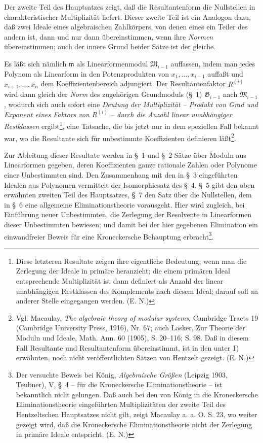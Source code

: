 \documentclass[11pt]{article}
\newcommand{\Gmod}{\mathfrak G}
\newcommand{\mideal}{\mathfrak m}
\begin{document}
Der zweite Teil des Hauptsatzes zeigt, daß die Resultantenform die Nullstellen in charakteristischer Multiplizität liefert. Dieser zweite Teil ist ein Analogon dazu, daß zwei Ideale eines algebraischen Zahlkörpers, von denen eines ein Teiler des andern ist, dann und nur dann übereinstimmen, wenn ihre \emph{Normen} übereinstimmen; auch der innere Grund beider Sätze ist der gleiche.

Es läßt sich nämlich $\mideal$ als Linearformenmodul $\mathfrak M_{i-1}$ auffassen, indem man jedes Polynom als Linearform in den Potenzprodukten von $x_1,\ldots,x_{i-1}$ auffaßt und $x_{i+1},\ldots,x_n$ dem Koeffizientenbereich adjungiert. Der Resultantenfaktor $R^{(i)}$ wird dann gleich der \emph{Norm} des zugehörigen Grundmoduls (§~1) $\Gmod_{i-1}$ nach $\mathfrak M_{i-1}$, wodurch sich auch sofort eine \emph{Deutung der Multiplizität -- Produkt von Grad und Exponent eines Faktors von $R^{(i)}$ -- durch die Anzahl linear unabhängiger Restklassen} ergibt\footnote{Diese letzteren Resultate zeigen ihre eigentliche Bedeutung, wenn man die Zerlegung der Ideale in primäre heranzieht; die einem primären Ideal entsprechende Multiplizität ist dann definiert als Anzahl der linear unabhängigen Restklassen des Komplements nach diesem Ideal; darauf soll an anderer Stelle eingegangen werden. (E. N.)}, eine Tatsache, die bis jetzt nur in dem speziellen Fall bekannt war, wo die Resultante sich für unbestimmte Koeffizienten definieren läßt\footnote{Vgl. Macaulay, \emph{The algebraic theory of modular systems}, Cambridge Tracts 19 (Cambridge University Press, 1916), Nr. 67; auch Lasker, Zur Theorie der Moduln und Ideale, Math. Ann. 60 (1905), S. 20--116; S. 98. Daß in diesem Fall Resultante und Resultantenform übereinstimmt, ist in den unter 1) erwähnten, noch nicht veröffentlichten Sätzen von Hentzelt gezeigt. (E. N.)}.

Zur Ableitung dieser Resultate werden in §~1 und §~2 Sätze über Moduln aus Linearformen gegeben, deren Koeffizienten ganze rationale Zahlen oder Polynome einer Unbestimmten sind. Den Zusammenhang mit den in §~3 eingeführten Idealen aus Polynomen vermittelt der Isomorphiesatz des §~4. §~5 gibt den oben erwähnten zweiten Teil des Hauptsatzes, §~7 den Satz über die Nullstellen, dem in §~6 eine allgemeine Eliminationstheorie vorausgeht. Hier wird zugleich, bei Einführung neuer Unbestimmten, die Zerlegung der Resolvente in Linearformen dieser Unbestimmten bewiesen; und damit bei der hier gegebenen Elimination ein einwandfreier Beweis für eine Kroneckersche Behauptung erbracht\footnote{Der versuchte Beweis bei König, \emph{Algebraische Größen} (Leipzig 1903, Teubner), V, §~4 -- für die Kroneckersche Eliminationstheorie -- ist bekanntlich nicht gelungen. Daß auch bei den von König in die Kroneckersche Eliminationstheorie eingeführten Multiplizitäten der zweite Teil des Hentzeltschen Hauptsatzes nicht gilt, zeigt Macaulay a. a. O. S. 23, wo weiter gezeigt wird, daß die Kroneckersche Eliminationstheorie nicht der Zerlegung in primäre Ideale entspricht. (E. N.)}.
\end{document}
